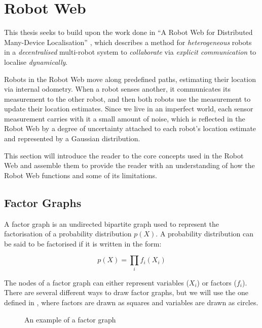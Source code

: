 \section{Robot Web}
This thesis seeks to build upon the work done in ``A Robot Web for Distributed Many-Device Localisation'' \cite{Robotweb}, which describes a method for \textit{heterogeneous} robots in a \textit{decentralised} multi-robot system to \textit{collaborate} via \textit{explicit communication} to localise \textit{dynamically}.

Robots in the Robot Web move along predefined paths, estimating their location via internal odometry. When a robot senses another, it communicates its measurement to the other robot, and then both robots use the measurement to update their location estimates. Since we live in an imperfect world, each sensor measurement carries with it a small amount of noise, which is reflected in the Robot Web by a degree of uncertainty attached to each robot's location estimate and represented by a Gaussian distribution.

This section will introduce the reader to the core concepts used in the Robot Web and assemble them to provide the reader with an understanding of how the Robot Web functions and some of its limitations.

\subsection{Factor Graphs} 
A factor graph is an undirected bipartite graph used to represent the factorisation of a probability distribution $p(X)$. A probability distribution can be said to be factorised if it is written in the form:

\begin{equation}
p(X) = \underset{i}{\prod} f_i(X_i)
\end{equation}

The nodes of a factor graph can either represent variables ($X_i$) or factors ($f_i$). There are several different ways to draw factor graphs, but we will use the one defined in \cite{FactorGraphDrawingFormat}, where factors are drawn as squares and variables are drawn as circles.

\begin{figure}[!h]
    \centering
    

    \caption[Example factor graph]{An example of a factor graph}
\end{figure}


